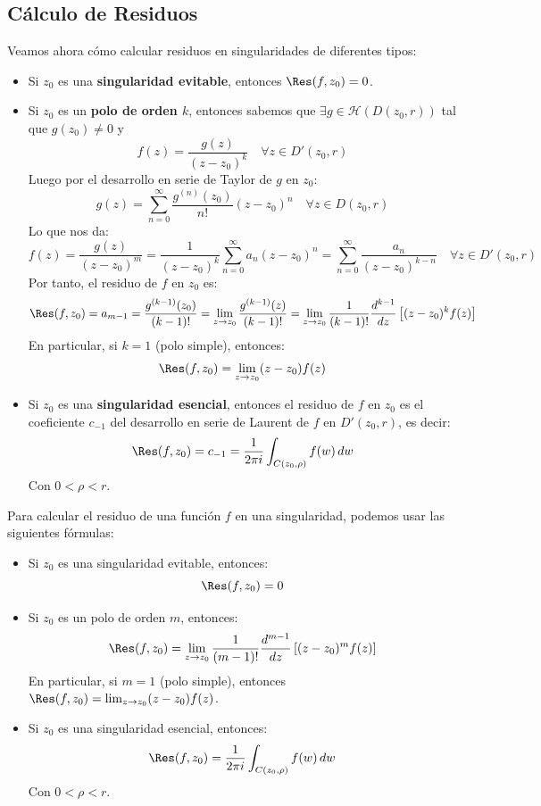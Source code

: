 \subsection{Cálculo de Residuos}

Veamos ahora cómo calcular residuos en singularidades de diferentes tipos:
\begin{itemize}
    \item Si $z_0$ es una \textbf{singularidad evitable}, entonces $\Res(f,z_0) = 0$.
    \item Si $z_0$ es un \textbf{polo de orden $k$}, entonces sabemos que $\exists g \in \mathcal{H}(D(z_0,r))$ tal que $g(z_0) \neq 0$ y
    \[
        f(z) =
        \frac{g(z)}{(z-z_0)^k} \quad \forall z \in D'(z_0,r)
    \]
    Luego por el desarrollo en serie de Taylor de $g$ en $z_0$:
    \[
        g(z) =
        \sum_{n=0}^{\infty} \frac{g^{(n)}(z_0)}{n!} (z-z_0)^n \quad \forall z \in D(z_0,r)
    \]
    Lo que nos da:
    \[
        f(z) =
        \frac{g(z)}{(z-z_0)^m} =
        \frac{1}{(z-z_0)^k} \sum_{n=0}^{\infty} a_n (z-z_0)^n =
        \sum_{n=0}^{\infty} \frac{a_n}{(z-z_0)^{k-n}} \quad \forall z \in D'(z_0,r)
    \]
    Por tanto, el residuo de $f$ en $z_0$ es:
    \[
        \Res(f,z_0) =
        a_{m-1} =
        \frac{g^{(k-1)}(z_0)}{(k-1)!} =
        \lim_{z \to z_0} \frac{g^{(k-1)}(z)}{(k-1)!} =
        \lim_{z \to z_0} \frac{1}{(k-1)!} \frac{d^{k-1}}{dz} \left[ (z-z_0)^k f(z) \right]
    \]
    En particular, si $k=1$ (polo simple), entonces:
    \[
        \Res(f,z_0) =
        \lim_{z \to z_0} (z-z_0) f(z)
    \]
    \item Si $z_0$ es una \textbf{singularidad esencial}, entonces el residuo de $f$ en $z_0$ es el coeficiente $c_{-1}$ del desarrollo en serie de Laurent de $f$ en $D'(z_0,r)$, es decir:
    \[
        \Res(f,z_0) =
        c_{-1} =
        \frac{1}{2 \pi i} \int_{C(z_0, \rho)} f(w) \, dw
    \]
    Con $0 < \rho < r$.
\end{itemize}

\begin{proposición}
    Para calcular el residuo de una función $f$ en una singularidad, podemos usar las siguientes fórmulas:
    \begin{itemize}
        \item Si $z_0$ es una singularidad evitable, entonces:
        \[
            \Res(f,z_0) = 0
        \]
        \item Si $z_0$ es un polo de orden $m$, entonces:
        \[
            \Res(f,z_0) =
            \lim_{z \to z_0} \frac{1}{(m-1)!} \frac{d^{m-1}}{dz} \left[ (z-z_0)^m f(z) \right]
        \]
        En particular, si $m=1$ (polo simple), entonces $\Res(f,z_0) = \lim_{z \to z_0} (z-z_0) f(z)$.
        \item Si $z_0$ es una singularidad esencial, entonces:
        \[
            \Res(f,z_0) =
            \frac{1}{2 \pi i} \int_{C(z_0, \rho)} f(w) \, dw
        \]
        Con $0 < \rho < r$.
    \end{itemize}
\end{proposición}

